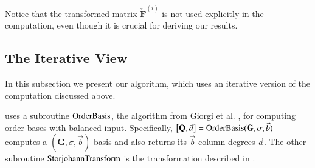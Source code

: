 Notice that the transformed matrix $\check{\mathbf{F}}^{\left(i\right)}$
is not used explicitly in the computation, even though it is crucial
for deriving our results.


\subsection{The Iterative View}

In this subsection we present our algorithm, which uses an iterative
version of the computation discussed above.%
\begin{comment}
The recursive top-down approach of the previous subsection is useful
for giving an overall picture of the computation process. Algorithm
\prettyref{alg:mab} uses an equivalent corresponding bottom-up iterative
approach. 
\end{comment}
{}%
\begin{comment}
, allowing the complexity to be more easily analyzed. 
\end{comment}
{}%
\begin{comment}
. In practice, bottom-up iterative approaches are more efficient than
the corresponding top-down recursive approaches. For our purpose,
it is also easier to analyze the computational cost of the iterative
procedure. 
\end{comment}
{}

 uses a subroutine $\mab$, the algorithm from
Giorgi et al. \citeyearpar{Giorgi2003}, for computing order bases
with balanced input. Specifically, $\left[\mathbf{Q},\vec{a}\right]=\mab(\mathbf{G},\sigma,\vec{b})$
computes a $(\mathbf{G},\sigma,\vec{b})$-basis and also returns its
$\vec{b}$-column degrees $\vec{a}$. The other subroutine $\StorjohannTransform$
is the transformation described in .

